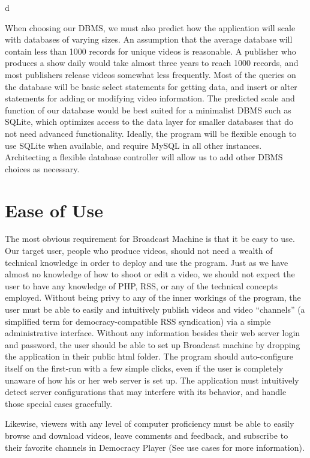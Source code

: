 d\documentclass[a4paper,12pt]{report}
\begin{document}
When choosing our DBMS, we must also predict how the application will scale with databases of varying sizes. 
An assumption that the average database will contain less than 1000 records for unique videos is reasonable. A publisher who produces a show daily would take almost three years to reach 1000 records, and most publishers release videos somewhat less frequently. 
Most of the queries on the database will be basic select statements for getting data, and insert or alter statements for adding or modifying video information. 
The predicted scale and function of our database would be best suited for a minimalist DBMS such as SQLite, which optimizes access to the data layer for smaller databases that do not need advanced functionality. 
Ideally, the program will be flexible enough to use SQLite when available, and require MySQL in all other instances. 
Architecting a flexible database controller will allow us to add other DBMS choices as necessary.

\section{Ease of Use}

	The most obvious requirement for Broadcast Machine is that it be easy to use. 
Our target user, people who produce videos, should not need a wealth of technical knowledge in order to deploy and use the program. 
Just as we have almost no knowledge of how to shoot or edit a video, we should not expect the user to have any knowledge of PHP, RSS, or any of the technical concepts employed. 
Without being privy to any of the inner workings of the program, the user must be able to easily and intuitively publish videos and video “channels” (a simplified term for democracy-compatible RSS syndication) via a simple administrative interface. 
Without any information besides their web server login and password, the user should be able to set up Broadcast machine by dropping the application in their public html folder. 
The program should auto-configure itself on the first-run with a few simple clicks, even if the user is completely unaware of how his or her web server is set up. 
The application must intuitively detect server configurations that may interfere with its behavior, and handle those special cases gracefully.

Likewise, viewers with any level of computer proficiency must be able to easily browse and download videos, leave comments and feedback, and subscribe to their favorite channels in Democracy Player (See use cases for more information).
\end{document}

